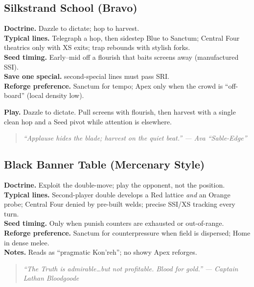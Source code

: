 \documentclass[11pt]{article}
\providecommand{\playdesc}[1]{\par\smallskip\noindent\small\textbf{Play.} #1\par}
\begin{document}
\subsection*{Silkstrand School (Bravo)}
\textbf{Doctrine.} Dazzle to dictate; hop to harvest.\\
\textbf{Typical lines.} Telegraph a hop, then sidestep Blue to Sanctum; Central Four theatrics only with XS exits; trap rebounds with stylish forks.\\
\textbf{Seed timing.} Early--mid off a flourish that baits screens away (manufactured SSI).\\
\textbf{Save one special.} second-special lines must pass SRI. \\
\textbf{Reforge preference.} Sanctum for tempo; Apex only when the crowd is ``off-board'' (local density low).
\playdesc{Dazzle to dictate. Pull screens with flourish, then harvest with a single clean hop and a Seed pivot while attention is elsewhere.}
\begin{quote}\small\itshape
``Applause hides the blade; harvest on the quiet beat.'' --- Ava ``Sable-Edge''
\end{quote}

\subsection*{Black Banner Table (Mercenary Style)}
\textbf{Doctrine.} Exploit the double-move; play the opponent, not the position.\\
\textbf{Typical lines.} Second-player double develops a Red lattice \emph{and} an Orange probe; Central Four denied by pre-built welds; precise SSI/XS tracking every turn.\\
\textbf{Seed timing.} Only when punish counters are exhausted or out-of-range.\\
\textbf{Reforge preference.} Sanctum for counterpressure when field is dispersed; Home in dense melee.\\
\textbf{Notes.} Reads as ``pragmatic Kon'reh''; no showy Apex reforges.
\begin{quote}\small\itshape
``The Truth is admirable\dots but not profitable. Blood for gold.'' --- Captain Lathan Bloodgoode
\end{quote}

\end{document}
